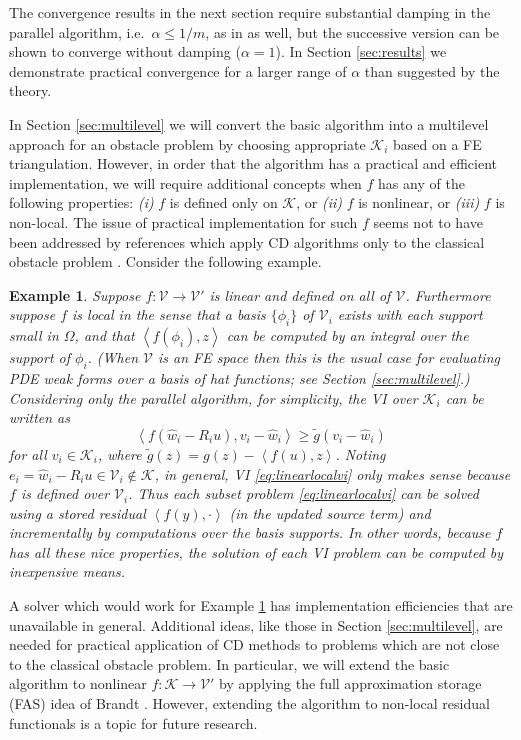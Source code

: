 \documentclass[letterpaper,final,12pt,reqno]{amsart}
\theoremstyle{cstyle}
\theoremstyle{cstyle*}
\theoremstyle{dstyle}
\newtheorem{example}[theorem]{Example}
\numberwithin{equation}{section}
\numberwithin{figure}{section}
\numberwithin{table}{section}
\numberwithin{theorem}{section}
\newcommand{\cK}{\mathcal{K}}
\newcommand{\cV}{\mathcal{V}}
\newcommand{\ip}[2]{\left<#1,#2\right>}
\begin{document}
The convergence results in the next section require substantial damping in the parallel algorithm, i.e.~$\alpha \le 1/m$, as in \cite{Tai2003} as well, but the successive version can be shown to converge without damping ($\alpha=1$).  In Section \ref{sec:results} we demonstrate practical convergence for a larger range of $\alpha$ than suggested by the theory.  %

In Section \ref{sec:multilevel} we will convert the basic algorithm into a multilevel approach for an obstacle problem by choosing appropriate $\cK_i$ based on a FE triangulation.  However, in order that the algorithm has a practical and efficient implementation, we will require additional concepts when $f$ has any of the following properties: \emph{(i)} $f$ is defined only on $\cK$, or \emph{(ii)} $f$ is nonlinear, or \emph{(iii)} $f$ is non-local.  The issue of practical implementation for such $f$ seems not to have been addressed by references which apply CD algorithms only to the classical obstacle problem \cite[in particular]{GraeserKornhuber2009,Tai2003}.  Consider the following example.

\begin{example}  \label{ex:fnice} Suppose $f:\cV \to \cV'$ is linear and defined on all of $\cV$.  Furthermore suppose $f$ is local in the sense that a basis $\{\phi_i\}$ of $\cV_i$ exists with each support small in $\Omega$, and that $\ip{f(\phi_i)}{z}$ can be computed by an integral over the support of $\phi_i$.  (When $\cV$ is an FE space then this is the usual case for evaluating PDE weak forms over a basis of hat functions; see Section \ref{sec:multilevel}.)  Considering only the parallel algorithm, for simplicity, the VI over $\cK_i$ can be written as
\begin{equation}
\ip{f(\hat w_i - R_i u)}{v_i-\hat w_i} \ge \tilde g(v_i-\hat w_i) \label{eq:linearlocalvi}
\end{equation}
for all $v_i\in \cK_i$, where $\tilde g(z) = g(z) - \ip{f(u)}{z}$.  Noting $e_i = \hat w_i - R_i u \in \cV_i \notin \cK$, in general, VI \eqref{eq:linearlocalvi} only makes sense because $f$ is defined over $\cV_i$.  Thus each subset problem \eqref{eq:linearlocalvi} can be solved using a stored residual $\ip{f(y)}{\cdot}$ (in the updated source term) and incrementally by computations over the basis supports.  In other words, because $f$ has all these nice properties, the solution of each VI problem can be computed by inexpensive means.
\end{example}

A solver which would work for Example \ref{ex:fnice} has implementation efficiencies that are unavailable in general.  Additional ideas, like those in Section \ref{sec:multilevel}, are needed for practical application of CD methods to problems which are not close to the classical obstacle problem.  In particular, we will extend the basic algorithm to nonlinear $f:\cK\to \cV'$ by applying the full approximation storage (FAS) idea of Brandt \cite{Brandt1977}.  However, extending the algorithm to non-local residual functionals is a topic for future research.
\end{document}
